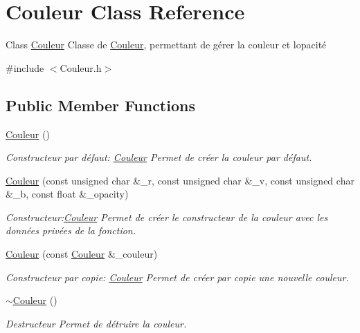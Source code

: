 \hypertarget{classCouleur}{}\section{Couleur Class Reference}
\label{classCouleur}


Class \hyperlink{classCouleur}{Couleur} Classe de \hyperlink{classCouleur}{Couleur}, permettant de gérer la couleur et l\textquotesingle{}opacité  




{\ttfamily \#include $<$Couleur.\+h$>$}

\subsection*{Public Member Functions}
\begin{DoxyCompactItemize}
\item 
\hyperlink{classCouleur_a687a457edb08b51dbcd0299bb0b6a882}{Couleur} ()
\begin{DoxyCompactList}\small\item\em Constructeur par défaut\+: \hyperlink{classCouleur}{Couleur} Permet de créer la couleur par défaut. \end{DoxyCompactList}\item 
\hyperlink{classCouleur_ac51d4f087f4ff01b84628557dc7a33f4}{Couleur} (const unsigned char \&\+\_\+r, const unsigned char \&\+\_\+v, const unsigned char \&\+\_\+b, const float \&\+\_\+opacity)
\begin{DoxyCompactList}\small\item\em Constructeur\+:\hyperlink{classCouleur}{Couleur} Permet de créer le constructeur de la couleur avec les données privées de la fonction. \end{DoxyCompactList}\item 
\hyperlink{classCouleur_a393a7c4193f593f083d7a25dba062cc5}{Couleur} (const \hyperlink{classCouleur}{Couleur} \&\+\_\+couleur)
\begin{DoxyCompactList}\small\item\em Constructeur par copie\+: \hyperlink{classCouleur}{Couleur} Permet de créer par copie une nouvelle couleur. \end{DoxyCompactList}\item 
\mbox{\label{classCouleur_ad3be30be83649bc5db48ef46b592aec2}} 
\hyperlink{classCouleur_ad3be30be83649bc5db48ef46b592aec2}{$\sim$\+Couleur} ()
\begin{DoxyCompactList}\small\item\em Destructeur Permet de détruire la couleur. \end{DoxyCompactList}\item 

\end{DoxyCompactItemize}
